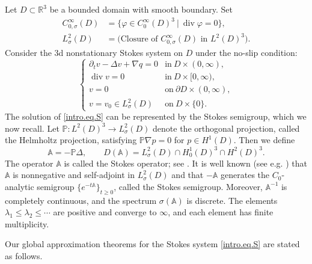\documentclass[11pt,a4paper]{article}
\numberwithin{equation}{section}
\newcommand{\R}{\mathbb{R}}
\newcommand{\opdiv}{\operatorname{div}}
\begin{document}
Let $D \subset \R^3$ be a bounded domain with smooth boundary. Set 
\[
    \begin{split}
    C^\infty_{0,\sigma}(D)
    &= \{\varphi\in C^\infty_0(D)^3~|~\opdiv\varphi=0\}, \\
    L^2_\sigma(D) 
    &= \big(\text{Closure of $C^\infty_{0,\sigma}(D)$ in $L^2(D)^3$}\big). 
    \end{split}
\]
Consider the 3d nonstationary Stokes system on $D$ under the no-slip condition: 
\begin{equation}\tag{S}\label{intro.eq.S}
    \left\{
    \begin{array}{ll}
    \partial_{t} v - \Delta v + \nabla q
    = 0&\mbox{in}\ D\times (0,\infty), \\
    \opdiv v
    = 0&\mbox{in}\ D\times [0,\infty), \\
    v
    = 0&\mbox{on}\ \partial D\times (0,\infty), \\
    v
    = v_0\in L^2_\sigma(D) &\mbox{on}\ D\times \{0\}.
    \end{array}\right.
\end{equation}
The solution of \eqref{intro.eq.S} can be represented by the Stokes semigroup, which we now recall. Let ${\mathbb P}: L^2(D)^3 \to L^2_\sigma(D)$ denote the orthogonal projection, called the Helmholtz projection, satisfying ${\mathbb P} \nabla p=0$ for $p\in H^1(D)$. Then we define 
\[
    {\mathbb A} = -{\mathbb P} \Delta,
    \qquad
    D({\mathbb A}) = L^{2}_{\sigma}(D) \cap H^{1}_0(D)^3 \cap H^{2}(D)^3. 
\]
The operator ${\mathbb A}$ is called the Stokes operator; see \cite[Section 2.1, I\hspace{-1.2pt}I\hspace{-1.2pt}I\hspace{-1.2pt}]{Soh2001book}. It is well known (see e.g. \cite[Chapter 2]{Lad1969book}) that ${\mathbb A}$ is nonnegative and self-adjoint in $L^{2}_{\sigma}(D)$ and that $-{\mathbb A}$ generates the $C_0$-analytic semigroup $\{e^{-t {\mathbb A}}\}_{t\ge0}$, called the Stokes semigroup. Moreover, ${\mathbb A}^{-1}$ is completely continuous, and the spectrum $\sigma({\mathbb A})$ is discrete. The elements $\lambda_1 \le \lambda_2 \le \cdots$ are positive and converge to $\infty$, and each element has finite multiplicity. 


Our global approximation theorems for the Stokes system \eqref{intro.eq.S} are stated as follows.
\end{document}
